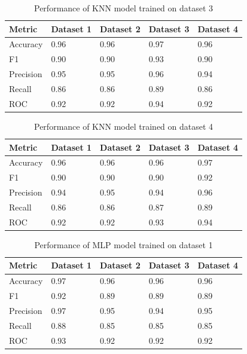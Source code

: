 \begin{table}[hbt]
\caption{Performance of KNN model trained on dataset 3}\label{tab:performance_of_knn_model_trained_on_dataset_3}
\begin{tabular*}{\tblwidth}{@{}LLLLL@{}}
\toprule
    Metric & Dataset 1 & Dataset 2 & Dataset 3 & Dataset 4 \\
\midrule
    Accuracy & 0.96 & 0.96 & 0.97 & 0.96 \\
    F1 & 0.90 & 0.90 & 0.93 & 0.90 \\
    Precision & 0.95 & 0.95 & 0.96 & 0.94 \\
    Recall & 0.86 & 0.86 & 0.89 & 0.86 \\
    ROC & 0.92 & 0.92 & 0.94 & 0.92 \\
\bottomrule
\end{tabular*}
\end{table}

\begin{table}[hbt]
\caption{Performance of KNN model trained on dataset 4}\label{tab:performance_of_knn_model_trained_on_dataset_4}
\begin{tabular*}{\tblwidth}{@{}LLLLL@{}}
\toprule
    Metric & Dataset 1 & Dataset 2 & Dataset 3 & Dataset 4 \\
\midrule
    Accuracy & 0.96 & 0.96 & 0.96 & 0.97 \\
    F1 & 0.90 & 0.90 & 0.90 & 0.92 \\
    Precision & 0.94 & 0.95 & 0.94 & 0.96 \\
    Recall & 0.86 & 0.86 & 0.87 & 0.89 \\
    ROC & 0.92 & 0.92 & 0.93 & 0.94 \\
\bottomrule
\end{tabular*}
\end{table}

\begin{table}[hbt]
\caption{Performance of MLP model trained on dataset 1}\label{tab:performance_of_mlp_model_trained_on_dataset_1}
\begin{tabular*}{\tblwidth}{@{}LLLLL@{}}
\toprule
    Metric & Dataset 1 & Dataset 2 & Dataset 3 & Dataset 4 \\
\midrule
    Accuracy & 0.97 & 0.96 & 0.96 & 0.96 \\
    F1 & 0.92 & 0.89 & 0.89 & 0.89 \\
    Precision & 0.97 & 0.95 & 0.94 & 0.95 \\
    Recall & 0.88 & 0.85 & 0.85 & 0.85 \\
    ROC & 0.93 & 0.92 & 0.92 & 0.92 \\
\bottomrule
\end{tabular*}
\end{table}

